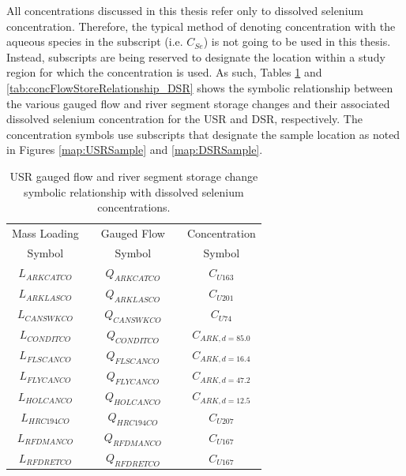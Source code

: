 \begin{linenumbers}
All concentrations discussed in this thesis refer only to dissolved selenium concentration.  Therefore, the typical method of denoting concentration with the aqueous species in the subscript (i.e. $ C_{Se} $) is not going to be used in this thesis.  Instead, subscripts are being reserved to designate the location within a study region for which the concentration is used.  As such, Tables \ref{tab:concFlowStoreRelationship_USR} and \ref{tab:concFlowStoreRelationship_DSR} shows the symbolic relationship between the various gauged flow and  river segment storage changes and their associated dissolved selenium concentration for the USR and DSR, respectively.  The concentration symbols use subscripts that designate the sample location as noted in Figures \ref{map:USRSample} and \ref{map:DSRSample}.

\setcounter{table}{0}
\subtabletop
\begin{table}[htbp]
	\centering
	\caption[USR gauged flow and river segment storage change symbolic relationship with dissolved selenium concentrations. ]{USR gauged flow and river segment storage change symbolic relationship with dissolved selenium concentrations.}
	\label{tab:concFlowStoreRelationship_USR}
	\begin{subtable}{\textwidth}
		\centering
		\begin{tabular}{c c c c c} 
			\toprule  
			Mass Loading & & Gauged Flow & & Concentration \\
			Symbol & & Symbol & & Symbol\\
			\toprule 
			$ L_{ARKCATCO} $ & & $ Q_{ARKCATCO} $ & & $ C_{U163} $\\
			$ L_{ARKLASCO} $ & & $ Q_{ARKLASCO} $ & & $ C_{U201} $\\
			$ L_{CANSWKCO} $ & & $ Q_{CANSWKCO} $ & & $ C_{U74} $\\
			$ L_{CONDITCO} $ & & $ Q_{CONDITCO} $ & & $ C_{ARK,d=85.0} $\\
			$ L_{FLSCANCO} $ & & $ Q_{FLSCANCO} $ & & $ C_{ARK,d=16.4} $\\
			$ L_{FLYCANCO} $ & & $ Q_{FLYCANCO} $ & & $ C_{ARK,d=47.2} $\\
			$ L_{HOLCANCO} $ & & $ Q_{HOLCANCO} $ & & $ C_{ARK,d=12.5} $\\
			$ L_{HRC194CO} $ & & $ Q_{HRC194CO} $ & & $ C_{U207} $\\
			$ L_{RFDMANCO} $ & & $ Q_{RFDMANCO} $ & & $ C_{U167} $\\
			$ L_{RFDRETCO} $ & & $ Q_{RFDRETCO} $ & & $ C_{U167} $\\

\end{tabular}
\end{subtable}
\end{table}
\end{linenumbers}
